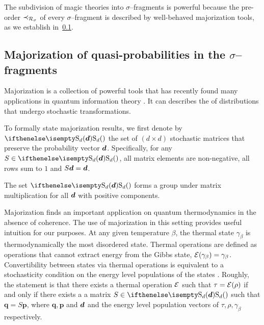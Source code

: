 \documentclass[pra,
aps,
twocolumn,
superscriptaddress,
groupedaddress,
nofootinbib,
reprint
]{revtex4-1}
\begin{document}
The subdivision of magic theories into $\sigma$--fragments is powerful because the pre-order $\prec_{\mathcal{R}_\sigma}$ of every $\sigma$--fragment is described by well-behaved majorization tools, as we establish in~\cref{sec:major}.

\subsection{Majorization of quasi-probabilities in the $\sigma$--fragments}\label{sec:major}

Majorization is a collection of powerful tools that has recently found many applications in quantum information theory .
It can describes the  of distributions that undergo stochastic transformations.

To formally state majorization results, we first denote by $\stoch$ the set of $(d \times d)$ stochastic matrices that preserve the probability vector $\bm{d}$. 
Specifically, for any $S \in \stoch$, all matrix elements are non-negative, all rows sum to $1$ and $S\bm{d} = \bm{d}$.

The set $\stoch$ forms a group under matrix multiplication for all $\bm{d}$ with positive components.

Majorization finds an important application on quantum thermodynamics in the absence of coherence.
The use of majorization in this setting provides useful intuition for our purposes.
At any given temperature $\beta$, the thermal state $\gamma_\beta$ is thermodynamically the most disordered state. 
Thermal operations are defined as operations that cannot extract energy from the Gibbs state, $\mathcal{E}(\gamma_\beta) = \gamma_\beta$.
Convertibility between states via thermal operations is equivalent to a stochasticity condition on the energy level populations of the states .
Roughly, the statement is that there exists a thermal operation $\mathcal{E}$ such that $\tau = \mathcal{E}(\rho)$ if and only if there exists a a matrix $S \in \stoch$ such that $\bm{q} = S\bm{p}$, where $\bm{q}, \bm{p}$ and $\bm{d}$ and the energy level population vectors of $\tau, \rho, \gamma_\beta$ respectively.
\end{document}
